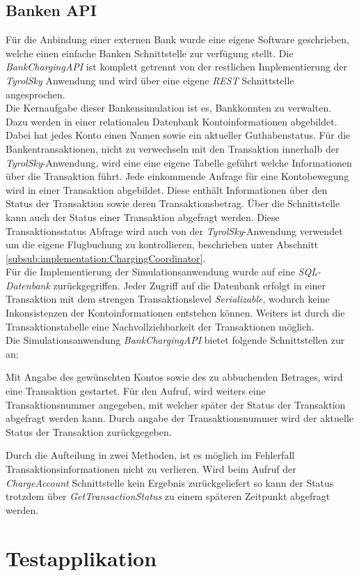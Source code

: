 \subsection{Banken API}
Für die Anbindung einer externen Bank wurde eine eigene Software geschrieben, welche einen einfache Banken Schnittstelle zur verfügung stellt. Die \textit{BankChargingAPI} ist komplett getrennt von der restlichen Implementierung der \textit{TyrolSky} Anwendung und wird über eine eigene \textit{REST} Schnittstelle angesprochen. \\
Die Kernaufgabe dieser Bankensimulation ist es, Bankkonnten zu verwalten. Dazu werden in einer relationalen Datenbank Kontoinformationen abgebildet. Dabei hat jedes Konto einen Namen sowie ein aktueller Guthabenstatus. Für die Bankentransaktionen, nicht zu verwechseln mit den Transaktion innerhalb der \textit{TyrolSky}-Anwendung, wird eine eine eigene Tabelle geführt welche Informationen über die Transaktion führt. Jede einkommende Anfrage für eine Kontobewegung wird in einer Transaktion abgebildet. Diese enthält Informationen über den Status der Transaktion sowie deren Transaktionsbetrag. Über die Schnittstelle kann auch der Status einer Transaktion abgefragt werden. Diese Transaktionsstatus Abfrage wird auch von der \textit{TyrolSky}-Anwendung verwendet um die eigene Flugbuchung zu kontrollieren, beschrieben unter Abschnitt \ref{subsub:implementation:ChargingCoordinator}. \\
Für die Implementierung der Simulationsanwendung wurde auf eine \textit{SQL-Datenbank} zurückgegriffen. Jeder Zugriff auf die Datenbank erfolgt in einer Transaktion mit dem strengen Transaktionslevel \textit{Serializable}, wodurch keine Inkonsistenzen der Kontoinformationen entstehen können. Weiters ist durch die Transaktionstabelle eine Nachvollziehbarkeit der Transaktionen möglich. \\
Die Simulationsanwendung \textit{BankChargingAPI} bietet folgende Schnittstellen zur an:
\begin{itemize}
        Mit Angabe des gewünschten Kontos sowie des zu abbuchenden Betrages, wird eine Transaktion gestartet. Für den Aufruf, wird weiters eine Transaktionsnummer angegeben, mit welcher später der Status der Transaktion abgefragt werden kann.
        Durch angabe der Transaktionsnummer wird der aktuelle Status der Transaktion zurückgegeben. 
\end{itemize}
Durch die Aufteilung in zwei Methoden, ist es möglich im Fehlerfall Transaktionsinformationen nicht zu verlieren. Wird beim Aufruf der \textit{ChargeAccount} Schnittstelle kein Ergebnis zurückgeliefert so kann der Status trotzdem über \textit{GetTransactionStatus} zu einem späteren Zeitpunkt abgefragt werden.

\label{subsec:implementation:bankApi}

\section{Testapplikation}
\label{subsec:implementation:TestApplikation} 